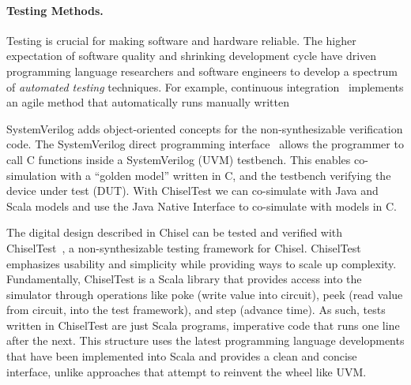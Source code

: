 \documentclass[fleqn,12pt]{article}
\begin{document}
\paragraph{Testing Methods.}
Testing is crucial for making software and hardware reliable. The higher
expectation of software quality and shrinking development cycle have
driven programming language researchers and software engineers to
develop a spectrum of \emph{automated testing} techniques.
For example, continuous integration~\cite{duvall2007continuous} 
implements an agile method that automatically runs manually written

SystemVerilog adds object-oriented concepts for the non-synthesizable verification code.
The SystemVerilog direct programming interface~\cite{Doulos:SV:dpi} allows the programmer to call
C functions inside a SystemVerilog (UVM) testbench.
This enables co-simulation with a ``golden model'' written in C, and the
testbench verifying the device under test (DUT).
With ChiselTest we can co-simulate with Java and Scala models and use the Java Native Interface
to co-simulate with models in C.
%

The digital design described in Chisel can be tested and verified with
ChiselTest~\cite{chisel:tester2}, a non-synthesizable testing framework for Chisel.
ChiselTest emphasizes usability and simplicity while providing ways to scale up complexity.
Fundamentally, ChiselTest is a Scala library that provides access into the simulator through
operations like poke (write value into circuit), peek (read value from circuit, into the test framework), and step (advance time).
As such, tests written in ChiselTest are just Scala programs, imperative code that runs one line after the next.
This structure uses the latest programming language developments that have been implemented into Scala
and provides a clean and concise interface, unlike approaches that attempt to reinvent the wheel like UVM.
\end{document}
